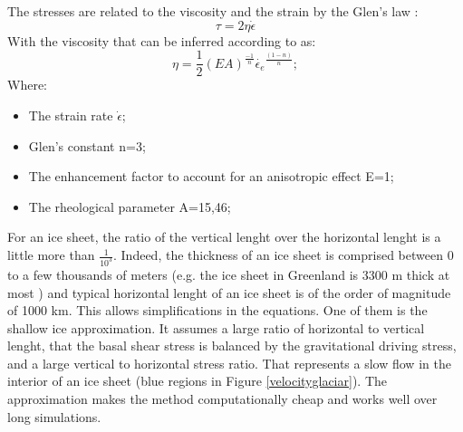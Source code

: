 \documentclass[a4paper,12pt]{article}
\begin{document}
The stresses are related to the viscosity and the strain by the Glen's law \cite[]{glen1958flow}:
\begin{equation}
	\tau = 2\eta\dot{\epsilon}
\end{equation}
With the viscosity that can be inferred according to \cite{gagliardini2013capabilities} as:
\begin{equation}
	\eta = \frac{1}{2}(EA)^\frac{-1}{n} \dot{\epsilon_e}^\frac{(1-n)}{n};
\end{equation}
Where:
\begin{itemize}
	\item The strain rate $\dot{\epsilon}$;
	\item Glen's constant n=3;
	\item The enhancement factor to account for an anisotropic effect E=1;
	\item The rheological parameter A=15,46;
\end{itemize}
For an ice sheet, the ratio of the vertical lenght over the horizontal lenght is a little more than $\frac{1}{10^3}$. Indeed, the thickness of an ice sheet is comprised between 0 to a few thousands of meters (e.g. the ice sheet in Greenland is 3300 m thick at most \cite[]{bamber2001new}) and typical horizontal lenght of an ice sheet is of the order of magnitude of 1000 km. This allows simplifications in the equations. One of them is the shallow ice approximation. It assumes a large ratio of horizontal to vertical lenght, that the basal shear stress is balanced by  the gravitational driving stress, and a large vertical to horizontal stress ratio. That represents a slow flow in the interior of an ice sheet (blue regions in Figure \ref{velocityglaciar}). The approximation makes the method computationally cheap and works well over long simulations.
\end{document}
